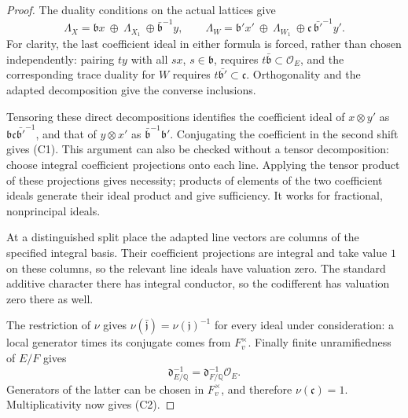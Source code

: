 \begin{proof}
The duality conditions on the actual lattices give
\[
 \Lambda_X=
   \mathfrak b x\ \oplus\ \Lambda_{X_1}\
          \oplus\bar{\mathfrak b}^{-1}y,\qquad
 \Lambda_W=
   \mathfrak b'x'\ \oplus\ \Lambda_{W_1}\
          \oplus\mathfrak c\,\bar{\mathfrak b'}^{-1}y'.
 \tag{C3}\label{eq:sr-cone-lattice-splitting}
\]
For clarity, the last coefficient ideal in either formula is forced,
rather than chosen independently: pairing \(t y\) with all \(s x\),
\(s\in\mathfrak b\), requires
\(t\bar{\mathfrak b}\subset\mathcal O_E\), and the corresponding
trace duality for \(W\) requires
\(t\bar{\mathfrak b'}\subset\mathfrak c\).
Orthogonality and the adapted decomposition give the converse inclusions.

Tensoring these direct decompositions identifies the coefficient ideal
of \(x\otimes y'\) as
\(\mathfrak b\mathfrak c\bar{\mathfrak b'}^{-1}\), and that of
\(y\otimes x'\) as \(\bar{\mathfrak b}^{-1}\mathfrak b'\).
Conjugating the coefficient in the second shift gives (C1).
This argument can also be checked without a tensor decomposition:
choose integral coefficient projections onto each line. Applying the
tensor product of these projections gives necessity; products of elements
of the two coefficient ideals generate their ideal product and give
sufficiency. It works for fractional, nonprincipal ideals.

At a distinguished split place the adapted line vectors are columns of
the specified integral basis. Their coefficient projections are integral
and take value \(1\) on these columns, so the relevant line ideals have
valuation zero. The standard additive character there has integral
conductor, so the codifferent has valuation zero there as well.

The restriction of \(\nu\) gives
\(\nu(\bar{\mathfrak j})=\nu(\mathfrak j)^{-1}\) for every ideal under
consideration: a local generator times its conjugate comes from
\(F_v^\times\). Finally finite unramifiedness of \(E/F\) gives
\[
 \mathfrak d_{E/\mathbb Q}^{-1}
   =\mathfrak d_{F/\mathbb Q}^{-1}\mathcal O_E.
\]
Generators of the latter can be chosen in \(F_v^\times\), and therefore
\(\nu(\mathfrak c)=1\). Multiplicativity now gives (C2).
\end{proof}

